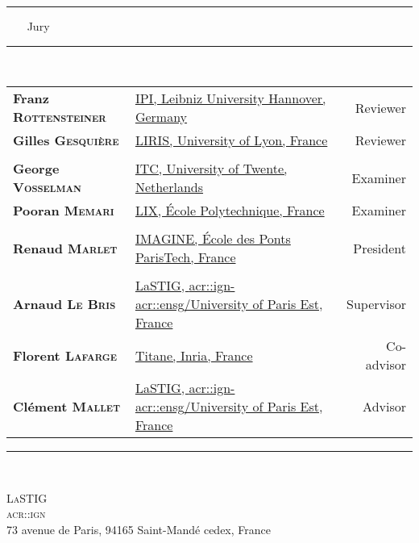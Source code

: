 \begin{titlepage}
\begin{center}
        \rule{.43\textwidth}{1pt} ~~~ {\Large Jury} ~~~ \rule{.43\textwidth}{1pt}\\
        \vspace*{1em}
        \begin{tabular}{l >{\small}x{.51\textwidth} r}
            \textbf{Franz \textsc{Rottensteiner}} & \href{https://www.ipi.uni-hannover.de/en/rottensteiner/}{IPI, Leibniz University Hannover, Germany} & Reviewer \\
            \textbf{Gilles \textsc{Gesquière}} & \href{https://perso.liris.cnrs.fr/gilles.gesquiere/wiki/doku.php}{LIRIS, University of Lyon, France} & Reviewer \\
             & & \\
            \textbf{George \textsc{Vosselman}} & \href{https://research.utwente.nl/en/persons/george-vosselman}{ITC, University of Twente, Netherlands} & Examiner \\
            \textbf{Pooran \textsc{Memari}} & \href{http://www.lix.polytechnique.fr/~memari/}{LIX, \'Ecole Polytechnique, France} & Examiner \\
             & & \\
            \textbf{Renaud \textsc{Marlet}} & \href{http://imagine.enpc.fr/~marletr/}{IMAGINE, \'Ecole des Ponts ParisTech, France} & President \\
             & & \\
            \textbf{Arnaud \textsc{Le Bris}} & \href{http://recherche.ign.fr/labos/matis/~Le_Bris}{LaSTIG, \acrshort*{acr::ign}-\acrshort*{acr::ensg}/University of Paris Est, France} & Supervisor \\
            \textbf{Florent \textsc{Lafarge}} & \href{https://www-sop.inria.fr/members/Florent.Lafarge/}{Titane, Inria, France} & Co-advisor \\
            \textbf{Clément \textsc{Mallet}} & \href{http://recherche.ign.fr/labos/matis/~mallet}{LaSTIG, \acrshort*{acr::ign}-\acrshort*{acr::ensg}/University of Paris Est, France} & Advisor \\
        \end{tabular}
        \vspace*{1em}
        \rule{\textwidth}{1pt}\\

        \vfill

        \begin{minipage}{.75\textwidth}
            \centering
            \small
            \textsc{LaSTIG\\ \acrfull*{acr::ign}}\\
            73 avenue de Paris, 94165 Saint-Mandé cedex, France
        \end{minipage}
    \end{center}
\end{titlepage}
